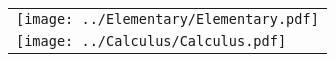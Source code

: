 \documentclass[hidelinks]{standalone}
\begin{document}
%
\def\arraystretch{0}%
\begin{tabular}{@{}l@{}}
\texttt{[image: ../Elementary/Elementary.pdf]}\\[-\baselineskip]
\texttt{[image: ../Calculus/Calculus.pdf]}\\[-\baselineskip]
\end{tabular}
\end{document}
